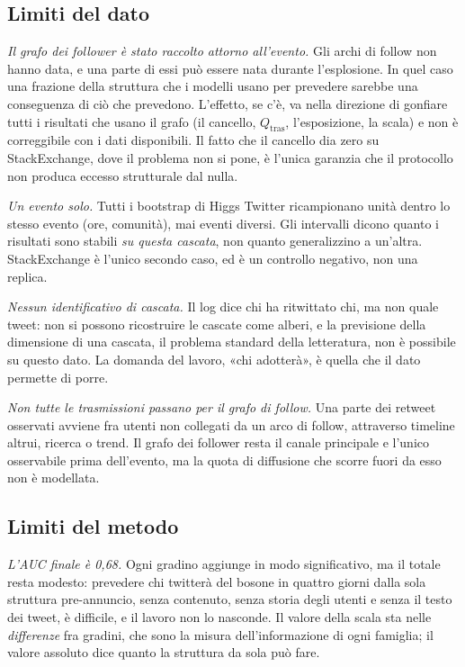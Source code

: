\documentclass[11pt,a4paper]{article}
\newcommand{\Qtras}{Q_{\mathrm{tras}}}
\newcommand{\sx}{StackExchange}
\newcommand{\hg}{Higgs Twitter}
\begin{document}
\subsection{Limiti del dato}
\emph{Il grafo dei follower è stato raccolto attorno all'evento.} Gli archi di follow non hanno data, e una parte di essi può essere nata durante l'esplosione. In quel caso una frazione della struttura che i modelli usano per prevedere sarebbe una conseguenza di ciò che prevedono. L'effetto, se c'è, va nella direzione di gonfiare tutti i risultati che usano il grafo (il cancello, $\Qtras$, l'esposizione, la scala) e non è correggibile con i dati disponibili. Il fatto che il cancello dia zero su \sx{}, dove il problema non si pone, è l'unica garanzia che il protocollo non produca eccesso strutturale dal nulla.

\emph{Un evento solo.} Tutti i bootstrap di \hg{} ricampionano unità dentro lo stesso evento (ore, comunità), mai eventi diversi. Gli intervalli dicono quanto i risultati sono stabili \emph{su questa cascata}, non quanto generalizzino a un'altra. \sx{} è l'unico secondo caso, ed è un controllo negativo, non una replica.

\emph{Nessun identificativo di cascata.} Il log dice chi ha ritwittato chi, ma non quale tweet: non si possono ricostruire le cascate come alberi, e la previsione della dimensione di una cascata, il problema standard della letteratura, non è possibile su questo dato. La domanda del lavoro, «chi adotterà», è quella che il dato permette di porre.

\emph{Non tutte le trasmissioni passano per il grafo di follow.} Una parte dei retweet osservati avviene fra utenti non collegati da un arco di follow, attraverso timeline altrui, ricerca o trend. Il grafo dei follower resta il canale principale e l'unico osservabile prima dell'evento, ma la quota di diffusione che scorre fuori da esso non è modellata.

\subsection{Limiti del metodo}
\emph{L'AUC finale è 0,68.} Ogni gradino aggiunge in modo significativo, ma il totale resta modesto: prevedere chi twitterà del bosone in quattro giorni dalla sola struttura pre-annuncio, senza contenuto, senza storia degli utenti e senza il testo dei tweet, è difficile, e il lavoro non lo nasconde. Il valore della scala sta nelle \emph{differenze} fra gradini, che sono la misura dell'informazione di ogni famiglia; il valore assoluto dice quanto la struttura da sola può fare.
\end{document}
